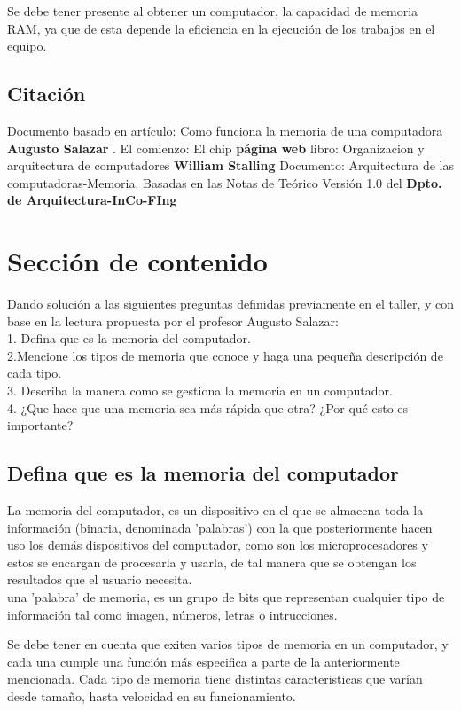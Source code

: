\documentclass{article}
\begin{document}
Se debe tener presente al obtener un computador, la capacidad de memoria RAM, ya que de esta depende la eficiencia en la ejecución de los trabajos en el equipo.

\subsection{Citación}
Documento basado en artículo: Como funciona la memoria de una computadora \textbf{Augusto Salazar} \cite{Salazar}.
El comienzo: El chip \textbf{página web}
\cite{website}
libro: Organizacion y arquitectura de computadores \textbf{William Stalling} \cite{Stalling}
Documento: Arquitectura de las computadoras-Memoria. Basadas en las Notas de Teórico Versión 1.0 del \textbf{Dpto. de Arquitectura-InCo-FIng}\cite{document}

\section{Sección de contenido} \label{contenido}
Dando solución a las siguientes preguntas definidas previamente en el taller, y con base en la lectura propuesta por el profesor Augusto Salazar:\\

%
1. Defina que es la memoria del computador.\\
2.Mencione los tipos de memoria que conoce y haga una pequeña descripción de cada tipo.\\
3. Describa la manera como se gestiona la memoria en un computador.\\
4. ¿Que hace que una memoria sea más rápida que otra? ¿Por qué esto es importante?\\


\subsection{Defina que es la memoria del computador}
%
La memoria del computador, es un dispositivo en el que se almacena toda la información (binaria, denominada 'palabras') con la que posteriormente hacen uso los demás dispositivos del computador, como son los microprocesadores y estos se encargan de procesarla y usarla, de tal manera que se obtengan los resultados que el usuario necesita.\\

una 'palabra' de memoria, es un grupo de bits que representan cualquier tipo de información tal como imagen, números, letras o intrucciones.

Se debe tener en cuenta que exiten varios tipos de memoria en un computador, y cada una cumple una función más especifica a parte de la anteriormente mencionada. Cada tipo de memoria tiene distintas caracteristicas que varían desde tamaño, hasta velocidad en su funcionamiento.
\end{document}
